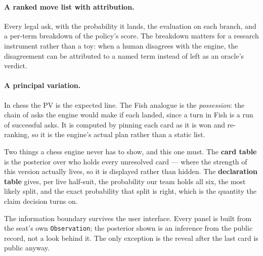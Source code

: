 \documentclass[11pt,a4paper]{article}
\begin{document}
\paragraph{A ranked move list with attribution.} Every legal ask, with the
probability it lands, the evaluation on each branch, and a per-term breakdown of
the policy's score. The breakdown matters for a research instrument rather than
a toy: when a human disagrees with the engine, the disagreement can be
attributed to a named term instead of left as an oracle's verdict.

\paragraph{A principal variation.} In chess the PV is the expected line. The
Fish analogue is the \emph{possession}: the chain of asks the engine would make
if each landed, since a turn in Fish is a run of successful asks. It is computed
by pinning each card as it is won and re-ranking, so it is the engine's actual
plan rather than a static list.

Two things a chess engine never has to show, and this one must. The
\textbf{card table} is the posterior over who holds every unresolved card ---
where the strength of this version actually lives, so it is displayed rather
than hidden. The \textbf{declaration table} gives, per live half-suit, the
probability our team holds all six, the most likely split, and the exact
probability that split is right, which is the quantity the claim decision turns
on.

The information boundary survives the user interface. Every panel is built from
the seat's own \texttt{Observation}; the posterior shown is an inference from the
public record, not a look behind it. The only exception is the reveal after the
last card is public anyway.
\end{document}
